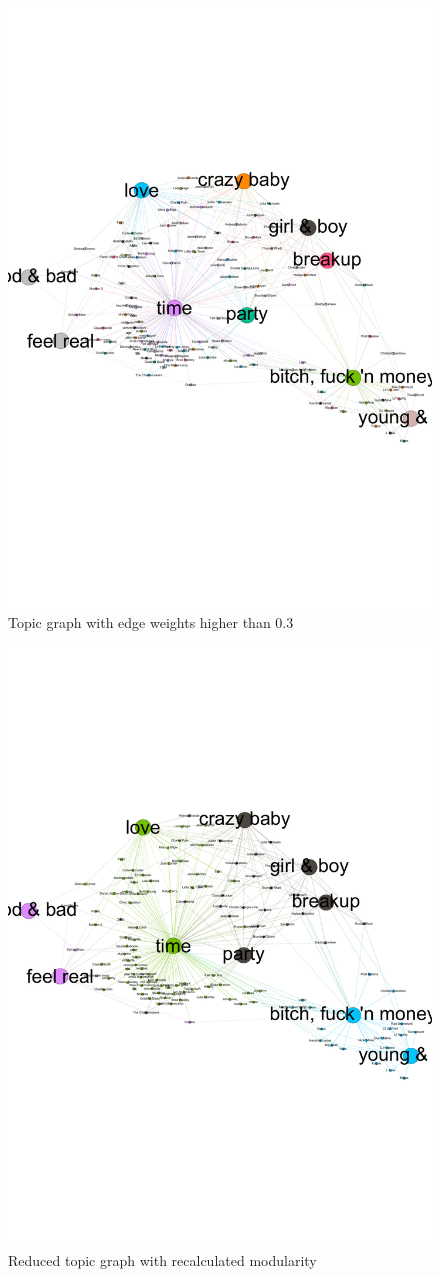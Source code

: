 \documentclass[10pt,a4paper]{article}
\begin{document}
		\begin{figure}[htb]
			\centering
			\includegraphics[trim=0mm 70mm 0mm 50mm, width=0.7\linewidth]{data/topic_graph_weight3-10}
			\caption{Topic graph with edge weights higher than $0.3$}
			\label{fig:reducedtopicgraph}
		\end{figure}
		
		\begin{figure}[htb]
			\centering
			\includegraphics[trim=0mm 50mm 0mm 50mm, clip, width=0.7\linewidth]{data/topic_graph_new_modularity}
			\caption{Reduced topic graph with recalculated modularity}
			\label{fig:topicnewmod}
		\end{figure}
		
\end{document}
